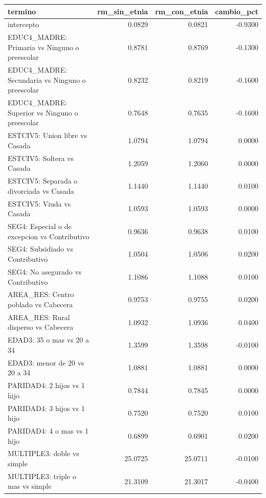 \begin{tabular}{lrrr}
\toprule
termino & rm\_sin\_etnia & rm\_con\_etnia & cambio\_pct \\
\midrule
intercepto & 0.0829 & 0.0821 & -0.9300 \\
EDUC4\_MADRE: Primaria vs Ninguno o preescolar & 0.8781 & 0.8769 & -0.1300 \\
EDUC4\_MADRE: Secundaria vs Ninguno o preescolar & 0.8232 & 0.8219 & -0.1600 \\
EDUC4\_MADRE: Superior vs Ninguno o preescolar & 0.7648 & 0.7635 & -0.1600 \\
ESTCIV5: Union libre vs Casada & 1.0794 & 1.0794 & 0.0000 \\
ESTCIV5: Soltera vs Casada & 1.2059 & 1.2060 & 0.0000 \\
ESTCIV5: Separada o divorciada vs Casada & 1.1440 & 1.1440 & 0.0100 \\
ESTCIV5: Viuda vs Casada & 1.0593 & 1.0593 & 0.0000 \\
SEG4: Especial o de excepcion vs Contributivo & 0.9636 & 0.9638 & 0.0100 \\
SEG4: Subsidiado vs Contributivo & 1.0504 & 1.0506 & 0.0200 \\
SEG4: No asegurado vs Contributivo & 1.1086 & 1.1088 & 0.0100 \\
AREA\_RES: Centro poblado vs Cabecera & 0.9753 & 0.9755 & 0.0200 \\
AREA\_RES: Rural disperso vs Cabecera & 1.0932 & 1.0936 & 0.0400 \\
EDAD3: 35 o mas vs 20 a 34 & 1.3599 & 1.3598 & -0.0100 \\
EDAD3: menor de 20 vs 20 a 34 & 1.0881 & 1.0881 & 0.0000 \\
PARIDAD4: 2 hijos vs 1 hijo & 0.7844 & 0.7845 & 0.0000 \\
PARIDAD4: 3 hijos vs 1 hijo & 0.7520 & 0.7520 & 0.0100 \\
PARIDAD4: 4 o mas vs 1 hijo & 0.6899 & 0.6901 & 0.0200 \\
MULTIPLE3: doble vs simple & 25.0725 & 25.0711 & -0.0100 \\
MULTIPLE3: triple o mas vs simple & 21.3109 & 21.3017 & -0.0400 \\
\bottomrule
\end{tabular}
